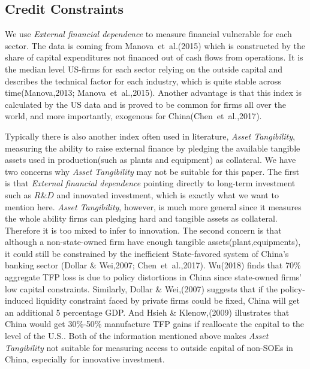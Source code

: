 \documentclass[12pt]{article}%
\begin{document}
\begin{CJK*}{GBK}{fs}
\subsection{Credit Constraints}
We use \emph{External financial dependence} to measure financial vulnerable for each sector. The data is coming from \textcolor[rgb]{0.00,0.07,1.00}{Manova~et~al.(2015)} which is constructed by the share of capital expenditures not financed out of cash flows from operations. It is the median level US-firms for each sector relying on the outside capital and describes the technical factor for each industry, which is quite stable across time(\textcolor[rgb]{0.00,0.07,1.00}{Manova,2013; Manova~et~al.,2015}). Another advantage is that this index is calculated by the US data and is proved to be common for firms all over the world, and more importantly, exogenous for China(\textcolor[rgb]{0.00,0.07,1.00}{Chen~et~al.,2017}). \par
Typically there is also another index often used in literature, \emph{Asset Tangibility}, measuring the ability to raise external finance by pledging the available tangible assets used in production(such as plants and equipment) as collateral. We have two concerns why \emph{Asset Tangibility} may not be suitable for this paper. The first is that \emph{External financial dependence} pointing directly to long-term investment such as $R\&D$ and innovated investment, which is exactly what we want to mention here. \emph{Asset Tangibility}, however, is much more general since it measures the whole ability firms can pledging hard and tangible assets as collateral. Therefore it is too mixed to infer to innovation. The second concern is that although a non-state-owned firm have enough tangible assets(plant,equipments), it could still be constrained by the inefficient State-favored system of China's banking sector (\textcolor[rgb]{0.00,0.07,1.00}{Dollar \& Wei,2007; Chen~et~al.,2017}). \textcolor[rgb]{0.00,0.07,1.00}{Wu(2018)} finds that 70\% aggregate TFP loss is due to policy distortions in China since state-owned firms' low capital constraints. Similarly, \textcolor[rgb]{0.00,0.07,1.00}{Dollar \& Wei,(2007)} suggests that if the policy-induced liquidity constraint faced by private firms could be fixed, China will get an additional 5 percentage GDP. And \textcolor[rgb]{0.00,0.07,1.00}{Hsieh \& Klenow,(2009)} illustrates that China would get 30\%-50\% manufacture TFP gains if reallocate the capital to the level of the U.S.. Both of the information mentioned above makes \emph{Asset Tangibility} not suitable for measuring access to outside capital of non-SOEs in China, especially for innovative investment.


\end{CJK*}
\end{document}
